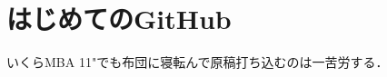 \documentclass[b5j,fleqn]{jsarticle}
\begin{document}
\section{はじめてのGitHub}
いくらMBA 11"でも布団に寝転んで原稿打ち込むのは一苦労する．
\end{document}
